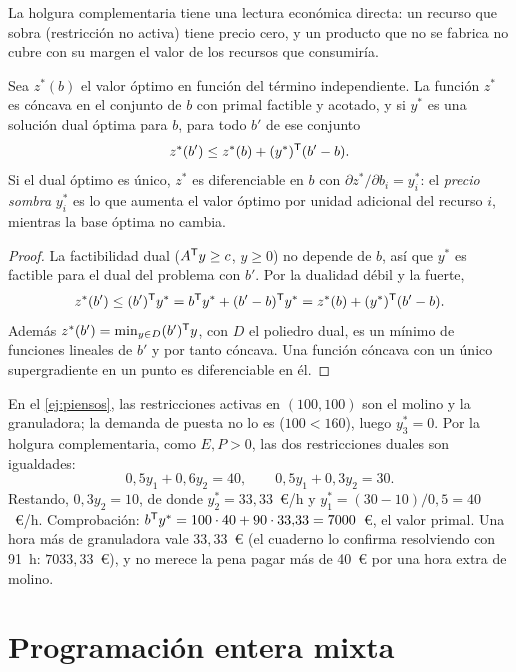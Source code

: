 La holgura complementaria tiene una lectura económica directa: un recurso que sobra (restricción no activa) tiene precio cero, y un producto que no se fabrica no cubre con su margen el valor de los recursos que consumiría.

\begin{proposicion}\label{prop:sombra}
Sea $z^{*}(b)$ el valor óptimo en función del término independiente. La función $z^{*}$ es cóncava en el conjunto de $b$ con primal factible y acotado, y si $y^{*}$ es una solución dual óptima para $b$, para todo $b'$ de ese conjunto
\[
z^{*}(b')\le z^{*}(b)+(y^{*})^{\mathsf{T}}(b'-b).
\]
Si el dual óptimo es único, $z^{*}$ es diferenciable en $b$ con $\partial z^{*}/\partial b_i=y_i^{*}$: el \emph{precio sombra} $y_i^{*}$ es lo que aumenta el valor óptimo por unidad adicional del recurso $i$, mientras la base óptima no cambia.
\end{proposicion}

\begin{proof}
La factibilidad dual ($A^{\mathsf{T}} y\ge c$, $y\ge 0$) no depende de $b$, así que $y^{*}$ es factible para el dual del problema con $b'$. Por la dualidad débil y la fuerte,
\[
z^{*}(b')\le (b')^{\mathsf{T}} y^{*}=b^{\mathsf{T}} y^{*}+(b'-b)^{\mathsf{T}} y^{*}=z^{*}(b)+(y^{*})^{\mathsf{T}}(b'-b).
\]
Además $z^{*}(b')=\min_{y\in D}(b')^{\mathsf{T}} y$, con $D$ el poliedro dual, es un mínimo de funciones lineales de $b'$ y por tanto cóncava. Una función cóncava con un único supergradiente en un punto es diferenciable en él.
\end{proof}

\begin{ejemplo}\label{ej:sombra-piensos}
En el \cref{ej:piensos}, las restricciones activas en $(100,100)$ son el molino y la granuladora; la demanda de puesta no lo es ($100<160$), luego $y_3^{*}=0$. Por la holgura complementaria, como $E,P>0$, las dos restricciones duales son igualdades:
\[
0{,}5y_1+0{,}6y_2=40,\qquad 0{,}5y_1+0{,}3y_2=30 .
\]
Restando, $0{,}3y_2=10$, de donde $y_2^{*}=33{,}33$~€/h y $y_1^{*}=(30-10)/0{,}5=40$~€/h. Comprobación: $b^{\mathsf{T}} y^{*}=100\cdot 40+90\cdot 33{,}33=7000$~€, el valor primal. Una hora más de granuladora vale $33{,}33$~€ (el cuaderno lo confirma resolviendo con 91~h: $7033{,}33$~€), y no merece la pena pagar más de 40~€ por una hora extra de molino.
\end{ejemplo}

\section{Programación entera mixta}

